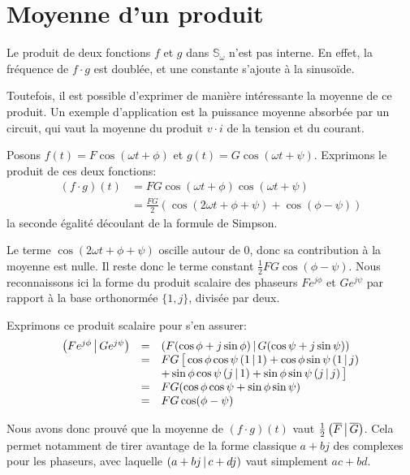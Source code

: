\section{Moyenne d'un produit}

Le produit de deux fonctions $f$ et $g$ dans $\mathbb{S}_\omega$
n'est pas interne.
En effet, la fréquence de $f \cdot g$ est doublée,
et une constante s'ajoute à la sinusoïde.

Toutefois, il est possible d'exprimer de manière intéressante
la moyenne de ce produit.
Un exemple d'application est la puissance moyenne absorbée par un circuit,
qui vaut la moyenne du produit $v\cdot i$ de la tension et du courant.

Posons $f(t) = F\cos(\omega t + \phi)$ et $g(t) = G\cos(\omega t + \psi)$.
Exprimons le produit de ces deux fonctions:
\begin{equation}
    \begin{split}
        (f\cdot g)(t) &= FG\cos(\omega t + \phi)\cos(\omega t + \psi) \\
        &= \frac{FG}{2}(\cos(2\omega t + \phi + \psi) + \cos(\phi - \psi))
    \end{split}
\end{equation}
la seconde égalité découlant de la formule de Simpson.

Le terme $\cos(2\omega t + \phi + \psi)$ oscille autour de 0,
donc sa contribution à la moyenne est nulle.
Il reste donc le terme constant $\frac{1}{2}FG\cos(\phi - \psi)$.
Nous reconnaissons ici la forme du produit scalaire des phaseurs
$Fe^{j\phi}$ et $Ge^{j\psi}$ par rapport à la base orthonormée $\{1,j\}$,
divisée par deux.

Exprimons ce produit scalaire pour s'en assurer:
\begin{equation}
    \begin{array}{rcl}
        \left(Fe^{j\phi}\,\middle|\,Ge^{j\psi}\right)
        &=& \left(F(\cos\phi+j\sin\phi)\,\middle|\,G(\cos\psi+j\sin\psi)\right) \\
        &=& FG\,\big[\cos\phi\cos\psi \left(1\,\middle|\,1\right)
        + \cos\phi\sin\psi \left(1\,\middle|\,j\right) \\
        && + \sin\phi\cos\psi \left(j\,\middle|\,1\right)
        + \sin\phi\sin\psi \left(j\,\middle|\,j\right)\big] \\
        &=& FG(\cos\phi\cos\psi + \sin\phi\sin\psi) \\
        &=& FG\cos(\phi-\psi)
    \end{array}
\end{equation}

Nous avons donc prouvé que la moyenne de $(f\cdot g)(t)$
vaut $\frac{1}{2}\left(\overline{F}\,\middle|\,\overline{G}\right)$.
Cela permet notamment de tirer avantage de la forme classique $a+bj$
des complexes pour les phaseurs,
avec laquelle $\left(a+bj\,\middle|\,c+dj\right)$ vaut simplement $ac + bd$.
